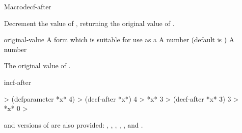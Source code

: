 \documentclass[10pt,twoside,english,pdftex]{article}
\begin{document}

\begin{functiondoc}{Macro}{decf-after}{
     
    \returns{} }
%

\fnsyntax

\fnpurpose Decrement the value of , returning the original value of
.

\fnpackage {}

\fnmodule {}

\fnargs
\begin{args}{original-value}
\arg[place] A form which is suitable for use as a 
\arg[decrement] A number (default is )
 A number
\end{args}

\fnreturns The original value of .

\begin{alsos}{incf-after}
\end{alsos}

\fnexamples
\begin{example}
%
\W\supp
  > (defparameter *x* 4)
  > (decf-after *x*)
  4 
  > *x*
  3
  > (decf-after *x* 3)
  3
  > *x*
  0
  >
\end{example}

\fnnote
%
%
%
%
%
%
%
%
 and  versions of  are also
provided: , ,
, ,
, and .

\end{functiondoc}

\end{document}
